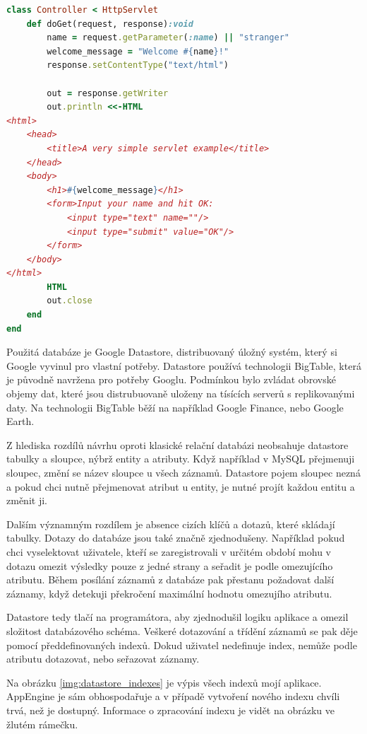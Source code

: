 \documentclass[bc,male,java,dept456]{diploma}						%
\begin{document}
\begin{lstlisting}[label=src:fib_mirah,caption=Hello World servlet v Mirah,language=Ruby]
class Controller < HttpServlet
	def doGet(request, response):void
		name = request.getParameter(:name) || "stranger"
		welcome_message = "Welcome #{name}!"
		response.setContentType("text/html")
 
		out = response.getWriter
		out.println <<-HTML
<html>
	<head>
		<title>A very simple servlet example</title>
	</head>
	<body>
		<h1>#{welcome_message}</h1>
		<form>Input your name and hit OK:
			<input type="text" name=""/>
			<input type="submit" value="OK"/>
		</form>
	</body>
</html>
		HTML
		out.close
	end
end
\end{lstlisting}

Použitá databáze je Google Datastore, distribuovaný úložný systém, který si Google vyvinul pro vlastní potřeby. Datastore používá technologii BigTable\cite{bigtable}, která je původně navržena pro potřeby Googlu. Podmínkou bylo zvládat obrovské objemy dat, které jsou distrubuovaně uloženy na tísících serverů s replikovanými daty. Na technologii BigTable běží na například Google Finance, nebo Google Earth.

Z hlediska rozdílů návrhu oproti klasické relační databázi neobsahuje datastore tabulky a sloupce, nýbrž entity a atributy. Když například v MySQL přejmenuji sloupec, změní se název sloupce u všech záznamů. Datastore pojem sloupec nezná a pokud chci nutně přejmenovat atribut u entity, je nutné projít každou entitu a změnit ji.

Dalším významným rozdílem je absence cizích klíčů a dotazů, které skládají tabulky. Dotazy do databáze jsou také značně zjednodušeny. Například pokud chci vyselektovat uživatele, kteří se zaregistrovali v určitém období mohu v dotazu omezit výsledky pouze z jedné strany a seřadit je podle omezujícího atributu. Během posílání záznamů z databáze pak přestanu požadovat další záznamy, když detekuji překročení maximální hodnotu omezujího atributu.

Datastore tedy tlačí na programátora, aby zjednodušil logiku aplikace a omezil slo\-ži\-tost databázového schéma. Veškeré dotazování a třídění záznamů se pak děje pomocí před\-de\-fi\-no\-va\-ných indexů. Dokud uživatel nedefinuje index, nemůže podle atributu dotazovat, nebo seřazovat záznamy.

Na obrázku \ref{img:datastore_indexes} je výpis všech indexů mojí aplikace. AppEngine je sám obhospodařuje a v případě vytvoření nového indexu chvíli trvá, než je dostupný. Informace o zpracování indexu je vidět na obrázku ve žlutém rámečku.
\end{document}
